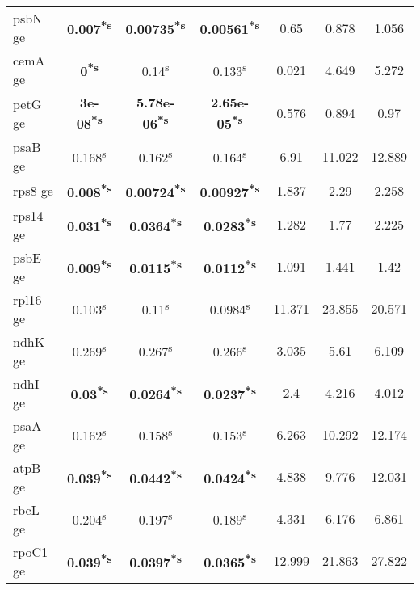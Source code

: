 \documentclass[a4paper]{article}
\begin{document}
\begin{longtable}{l|c|c|c|c|c|c}
psbN ge&\textbf{0.007\textsuperscript{*}\textsuperscript{s}}&\textbf{0.00735\textsuperscript{*}\textsuperscript{s}}&\textbf{0.00561\textsuperscript{*}\textsuperscript{s}}&0.65&0.878&1.056\\
cemA ge&\textbf{0\textsuperscript{*}\textsuperscript{s}}&0.14\textsuperscript{s}&0.133\textsuperscript{s}&0.021&4.649&5.272\\
petG ge&\textbf{3e-08\textsuperscript{*}\textsuperscript{s}}&\textbf{5.78e-06\textsuperscript{*}\textsuperscript{s}}&\textbf{2.65e-05\textsuperscript{*}\textsuperscript{s}}&0.576&0.894&0.97\\
psaB ge&0.168\textsuperscript{s}&0.162\textsuperscript{s}&0.164\textsuperscript{s}&6.91&11.022&12.889\\
rps8 ge&\textbf{0.008\textsuperscript{*}\textsuperscript{s}}&\textbf{0.00724\textsuperscript{*}\textsuperscript{s}}&\textbf{0.00927\textsuperscript{*}\textsuperscript{s}}&1.837&2.29&2.258\\
rps14 ge&\textbf{0.031\textsuperscript{*}\textsuperscript{s}}&\textbf{0.0364\textsuperscript{*}\textsuperscript{s}}&\textbf{0.0283\textsuperscript{*}\textsuperscript{s}}&1.282&1.77&2.225\\
psbE ge&\textbf{0.009\textsuperscript{*}\textsuperscript{s}}&\textbf{0.0115\textsuperscript{*}\textsuperscript{s}}&\textbf{0.0112\textsuperscript{*}\textsuperscript{s}}&1.091&1.441&1.42\\
rpl16 ge&0.103\textsuperscript{s}&0.11\textsuperscript{s}&0.0984\textsuperscript{s}&11.371&23.855&20.571\\
ndhK ge&0.269\textsuperscript{s}&0.267\textsuperscript{s}&0.266\textsuperscript{s}&3.035&5.61&6.109\\
ndhI ge&\textbf{0.03\textsuperscript{*}\textsuperscript{s}}&\textbf{0.0264\textsuperscript{*}\textsuperscript{s}}&\textbf{0.0237\textsuperscript{*}\textsuperscript{s}}&2.4&4.216&4.012\\
psaA ge&0.162\textsuperscript{s}&0.158\textsuperscript{s}&0.153\textsuperscript{s}&6.263&10.292&12.174\\
atpB ge&\textbf{0.039\textsuperscript{*}\textsuperscript{s}}&\textbf{0.0442\textsuperscript{*}\textsuperscript{s}}&\textbf{0.0424\textsuperscript{*}\textsuperscript{s}}&4.838&9.776&12.031\\
rbcL ge&0.204\textsuperscript{s}&0.197\textsuperscript{s}&0.189\textsuperscript{s}&4.331&6.176&6.861\\
rpoC1 ge&\textbf{0.039\textsuperscript{*}\textsuperscript{s}}&\textbf{0.0397\textsuperscript{*}\textsuperscript{s}}&\textbf{0.0365\textsuperscript{*}\textsuperscript{s}}&12.999&21.863&27.822\\

\end{longtable}
\end{document}
